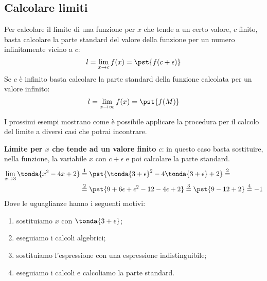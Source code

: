 \subsection{Calcolare limiti}
\label{subsec:cont_limiti_calcolo}

\begin{procedura}
Per calcolare il limite di una funzione per \(x\) che tende a un certo 
valore, \(c\) finito, basta calcolare la parte standard del valore della 
funzione per un numero infinitamente vicino a \(c\):
\[l=\lim_{x \rightarrow c} f(x) = \pst{f(c+\epsilon)}\]
Se \(c\) è infinito basta calcolare la parte standard della funzione 
calcolata per un valore infinito:
\[l=\lim_{x \rightarrow \infty} f(x) = \pst{f(M)}\]
\end{procedura}

I prossimi esempi mostrano come è possibile applicare la procedura per il 
calcolo del limite a diversi casi che potrai incontrare.

\begin{esempio}
\textbf{Limite per \(x\) che tende ad un valore finito \(c\)}:
in questo caso basta sostituire, nella funzione, la variabile \(x\) con 
\(c+\epsilon\) e poi calcolare la parte standard.
\begin{align*}
\lim_{x \rightarrow 3} \tonda{x^2-4x+2} & \stackrel{1}{=} 
  \pst{\tonda{3+\epsilon}^2-4\tonda{3+\epsilon}+2} \stackrel{2}{=}\\  
  & \stackrel{2}{=} \pst{9 + 6 \epsilon + \epsilon^2 - 12 - 4\epsilon + 2} 
  \stackrel{3}{=} \pst{9 - 12 + 2} \stackrel{4}{=} -1
\end{align*}
Dove le uguaglianze hanno i seguenti motivi:
\begin{enumerate} [nosep]
 \item sostituiamo \(x\) con \(\tonda{3+\epsilon}\);
 \item eseguiamo i calcoli algebrici;
 \item sostituiamo l'espressione con una espressione indistinguibile;
 \item eseguiamo i calcoli e calcoliamo la parte standard.
\end{enumerate}
\end{esempio}

